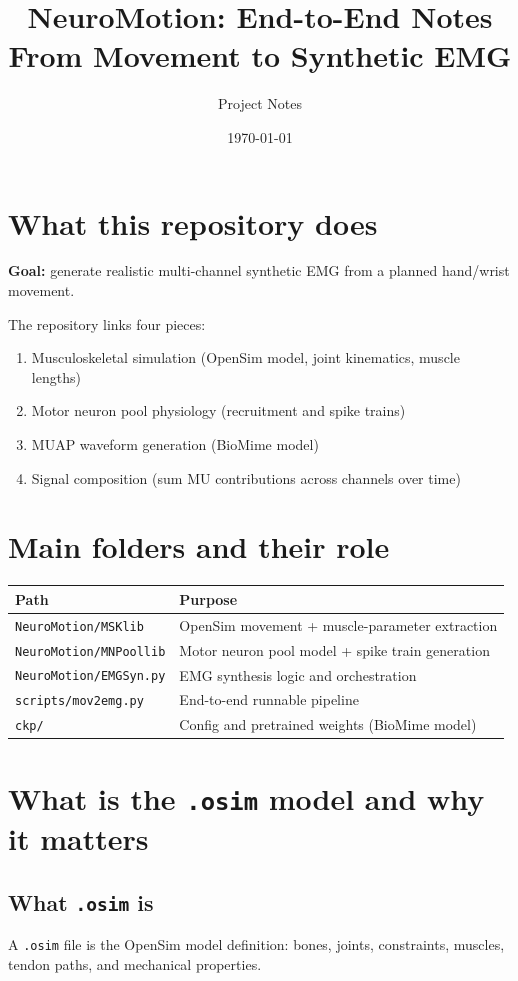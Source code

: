 \documentclass[11pt,a4paper]{article}
\title{NeuroMotion: End-to-End Notes\\\large From Movement to Synthetic EMG}
\author{Project Notes}
\date{\today}
\begin{document}
\maketitle

\section{What this repository does}

\textbf{Goal:} generate realistic multi-channel synthetic EMG from a planned hand/wrist movement.

The repository links four pieces:
\begin{enumerate}
    \item Musculoskeletal simulation (OpenSim model, joint kinematics, muscle lengths)
    \item Motor neuron pool physiology (recruitment and spike trains)
    \item MUAP waveform generation (BioMime model)
    \item Signal composition (sum MU contributions across channels over time)
\end{enumerate}

\section{Main folders and their role}

\begin{tabular}{@{}ll@{}}
\toprule
\textbf{Path} & \textbf{Purpose} \\
\midrule
\texttt{NeuroMotion/MSKlib} & OpenSim movement + muscle-parameter extraction \\
\texttt{NeuroMotion/MNPoollib} & Motor neuron pool model + spike train generation \\
\texttt{NeuroMotion/EMGSyn.py} & EMG synthesis logic and orchestration \\
\texttt{scripts/mov2emg.py} & End-to-end runnable pipeline \\
\texttt{ckp/} & Config and pretrained weights (BioMime model) \\
\bottomrule
\end{tabular}

\section{What is the \texttt{.osim} model and why it matters}

\subsection*{What \texttt{.osim} is}
A \texttt{.osim} file is the OpenSim model definition: bones, joints, constraints, muscles, tendon paths, and mechanical properties.
\end{document}
